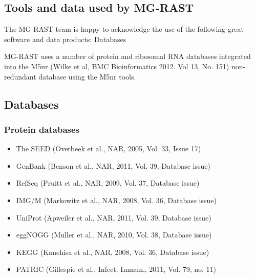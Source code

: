 \documentclass[12pt,fullpage]{report}
\begin{document}
\begin{appendices}
\chapter{Tools and data used by MG-RAST}
The MG-RAST team is happy to acknowledge the use of the following great software and data products:
Databases

MG-RAST uses a number of protein and ribosomal RNA databases integrated into the M5nr \cite{M5NR} (Wilke et al, BMC Bioinformatics 2012. Vol 13, No. 151) non-redundant database using the M5nr tools.
\section{Databases}
\subsection{Protein databases}
\begin{itemize}
  \item    The \gls{SEED} \cite{SUBSYSTEMS} (Overbeek et al., NAR, 2005, Vol. 33, Issue 17)
 \item     GenBank \cite{GENBANK} (Benson et al., NAR, 2011, Vol. 39, Database issue)
 \item     RefSeq \cite{REFSEQ} (Pruitt et al., NAR, 2009, Vol. 37, Database issue)
  \item    IMG/M (Markowitz et al., NAR, 2008, Vol. 36, Database issue)
  \item    UniProt \cite{UNIPROT} (Apweiler et al., NAR, 2011, Vol. 39, Database issue)
 \item     eggNOGG \cite{EGGNOG} (Muller et al., NAR, 2010, Vol. 38, Database issue)
 \item     KEGG \cite{KEGG} (Kanehisa et al., NAR, 2008, Vol. 36, Database issue)
\item     PATRIC \cite{PATRIC} (Gillespie et al., Infect. Immun., 2011, Vol. 79, no. 11)
\end{itemize}

\end{appendices}
\end{document}
